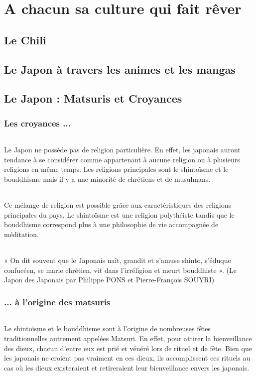 \part{A chacun sa culture qui fait rêver}
\chapter{Le Chili}

\chapter{Le Japon à travers les animes et les mangas}

\chapter{Le Japon : Matsuris et Croyances}
\section{Les croyances ...}
\paragraph{}
Le Japon ne possède pas de religion particulière. En effet, les japonais auront tendance à se considérer comme appartenant à aucune religion ou à plusieurs religions en même temps. Les religions principales sont le shintoïsme et le bouddhisme mais il y a une minorité de chrétiens et de musulmans. 
\paragraph{}
Ce mélange de religion est possible grâce aux caractéristiques des religions principales du pays. Le shintoïsme est une religion polythéiste tandis que le bouddhisme correspond plus à une philosophie de vie accompagnée de méditation.
\paragraph{}
« On dit souvent que le Japonais naît, grandit et s’amuse shinto, s’éduque confucéen, se marie chrétien, vit dans l’irréligion et meurt bouddhiste ». (Le Japon des Japonais par Philippe PONS et Pierre-François SOUYRI)

\section{... à l'origine des matsuris}
\paragraph{}
Le shintoïsme et le bouddhisme sont à l’origine de nombreuses fêtes traditionnelles autrement appelées Matsuri. En effet, pour attirer la bienveillance des dieux, chacun d’entre eux est prié et vénéré lors de rituel et de fête. Bien que les japonais ne croient pas vraiment en ces dieux, ils accomplissent ces rituels au cas où les dieux existeraient et retireraient leur bienveillance envers les japonais.
